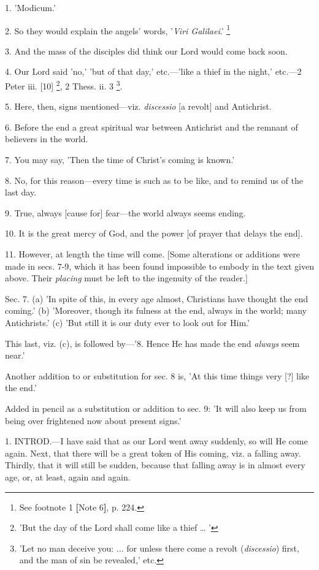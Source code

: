 
1. 'Modicum.'

2. So they would explain the angels' words, '\emph{Viri
Galilaei}.' \footnote{See footnote 1 \textbf{[}Note
6\textbf{]},
p. 224.}

3. And the mass of the disciples did think our
Lord would come back soon.

4. Our Lord said 'no,' 'but of that day,'
etc.—'like a thief in the night,' etc.—2 Peter iii. [10] \footnote{'But the day of the Lord
shall come like a thief … '}, 2 Thess. ii. 3 \footnote{'Let no man deceive you:
... for unless there come a revolt (\emph{discessio}) first, and the
man of sin be revealed,' etc.}.

5. Here, then, signs mentioned—viz. \emph{discessio}
[a revolt] and Antichrist.

6. Before the end a great spiritual war between
Antichrist and the remnant of believers in the world.

7. You may say, 'Then the time of Christ's coming
is known.'

8. No, for this reason—every time is such as to
be like, and to remind us of the last day.

9. True, always [cause for] fear—the world
always seems ending.

10. It is the great mercy of God, and the power
[of prayer that delays the end].

11. However, at length the time will come. [Some
alterations or additions were made in secs. 7-9, which it has been
found impossible to embody in the text given above. Their \emph{placing}
must be left to the ingenuity of the reader.]

Sec. 7. (a) 'In spite of this, in every age
almost, Christians have thought the end coming.' (b) 'Moreover,
though its fulness at the end, always in the world; many Antichrists.'
(c) 'But still it is our duty ever to look out for Him.'

This last, viz. (c), is followed by—'8. Hence
He has made the end \emph{always} seem near.'

Another addition to or substitution for sec. 8
is, 'At this time things very [?] like the end.'

Added in pencil as a substitution or addition to
sec. 9: 'It will also keep us from being over frightened now about
present signs.'


1. INTROD.—I
have said that as our Lord went away suddenly, so will He come again.
Next, that there will be a great token of His coming, viz. a falling
away. Thirdly, that it will still be sudden, because that falling away
is in almost every age, or, at least, again and again.

